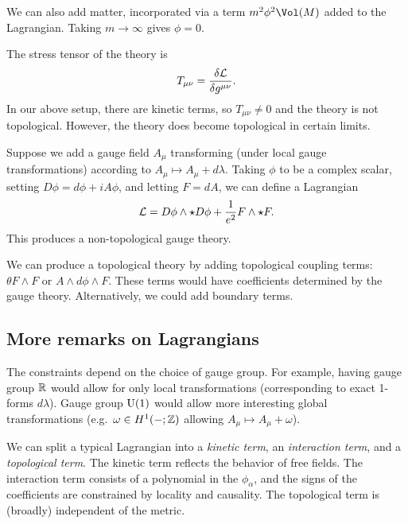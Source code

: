 We can also add matter, incorporated via a term $m^2 \phi^2 \Vol(M)$ added to the Lagrangian.
Taking $m \to \infty$ gives $\phi = 0$.

The stress tensor of the theory is
\[
	T_{\mu\nu} = \frac{\delta \mathcal{L}}{\delta g^{\mu\nu}}.
\]
In our above setup, there are kinetic terms, so $T_{\mu\nu} \neq 0$ and the theory is not topological.
However, the theory does become topological in certain limits.

Suppose we add a gauge field $A_\mu$ transforming (under local gauge transformations) according to $A_\mu \mapsto A_\mu + d\lambda$.
Taking $\phi$ to be a complex scalar, setting $D\phi = d\phi + i A \phi$, and letting $F = dA$, we can define a Lagrangian
\[
	\mathcal{L} = D \phi \wedge \star D\phi + \frac{1}{e^2} F \wedge \star F.
\]
This produces a non-topological gauge theory.

We can produce a topological theory by adding topological coupling terms: $\theta F \wedge F$ or $A \wedge d\phi \wedge F$.
These terms would have coefficients determined by the gauge theory.
Alternatively, we could add boundary terms.

\subsection{More remarks on Lagrangians}

The constraints depend on the choice of gauge group.
For example, having gauge group $\mathbb{R}$ would allow for only local transformations (corresponding to exact 1-forms $d \lambda$).
Gauge group $\mathrm{U}(1)$ would allow more interesting global transformations (e.g.\ $\omega \in H^1(-; \mathbb{Z})$ allowing $A_\mu \mapsto A_\mu + \omega$).

We can split a typical Lagrangian into a \emph{kinetic term}, an \emph{interaction term}, and a \emph{topological term}.
The kinetic term reflects the behavior of free fields.
The interaction term consists of a polynomial in the $\phi_\alpha$, and the signs of the coefficients are constrained by locality and causality.
The topological term is (broadly) independent of the metric.
